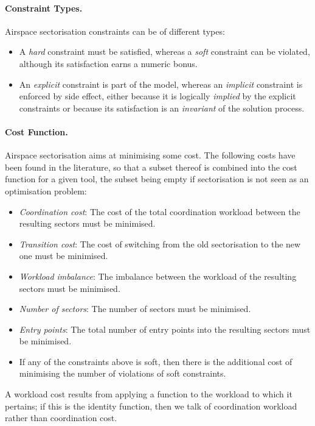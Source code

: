 \documentclass[a4paper,12pt]{article}
\begin{document}
\paragraph{Constraint Types.}
Airspace sectorisation constraints can be of different types:
\begin{itemize}
\item A \emph{hard} constraint must be satisfied, whereas a
  \emph{soft} constraint can be violated, although its satisfaction
  earns a numeric bonus.
\item An \emph{explicit} constraint is part of the model, whereas an
  \emph{implicit} constraint is enforced by side effect, either
  because it is logically \emph{implied} by the explicit constraints
  or because its satisfaction is an \emph{invariant} of the solution
  process.
\end{itemize}

\paragraph{Cost Function.}
Airspace sectorisation aims at minimising some cost.  The following
costs have been found in the literature, so that a subset thereof is
combined into the cost function for a given tool, the subset being
empty if sectorisation is not seen as an optimisation problem:
\begin{itemize}
\item \emph{Coordination cost}: The cost of the total coordination
  workload between the resulting sectors must be minimised.
\item \emph{Transition cost}: The cost of switching from the old
  sectorisation to the new one must be minimised.
\item \emph{Workload imbalance}: The imbalance between the workload of
  the resulting sectors must be minimised.
\item \emph{Number of sectors}: The number of sectors must be
  minimised.
\item \emph{Entry points}: The total number of entry points into the
  resulting sectors must be minimised.
\item If any of the constraints above is soft, then there is the
  additional cost of minimising the number of violations of soft
  constraints.
\end{itemize}
A workload cost results from applying a function to the workload to
which it pertains; if this is the identity function, then we talk of
coordination workload rather than coordination cost.
\end{document}
